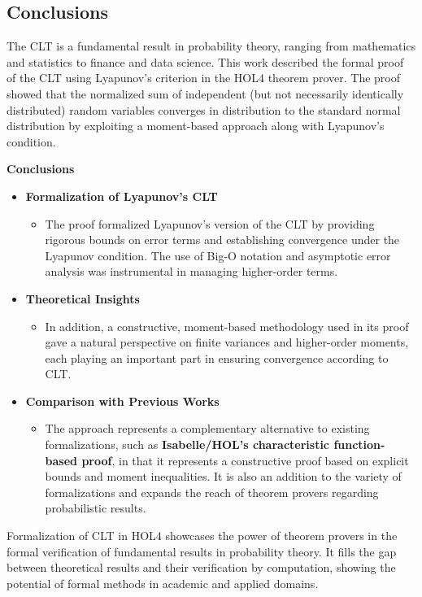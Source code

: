 \subsection{Conclusions}
The CLT is a fundamental result in probability theory, ranging from mathematics and statistics to finance and data science. This work described the formal proof of the CLT using Lyapunov's criterion in the HOL4 theorem prover. The proof showed that the normalized sum of independent (but not necessarily identically distributed) random variables converges in distribution to the standard normal distribution by exploiting a moment-based approach along with Lyapunov's condition.

\textbf{Conclusions}
\begin{itemize}
    \item \textbf{Formalization of Lyapunov's CLT}
    \begin{itemize}
        \item The proof formalized Lyapunov's version of the CLT by providing rigorous bounds on error terms and establishing convergence under the Lyapunov condition. The use of Big-O notation and asymptotic error analysis was instrumental in managing higher-order terms.
    \end{itemize}

    \item \textbf{Theoretical Insights}
    \begin{itemize}
        \item In addition, a constructive, moment-based methodology used in its proof gave a natural perspective on finite variances and higher-order moments, each playing an important part in ensuring convergence according to CLT.
    \end{itemize}

    \item \textbf{Comparison with Previous Works}
    \begin{itemize}
        \item The approach represents a complementary alternative to existing formalizations, such as \textbf{Isabelle/HOL's characteristic function-based proof}, in that it represents a constructive proof based on explicit bounds and moment inequalities. It is also an addition to the variety of formalizations and expands the reach of theorem provers regarding probabilistic results.
    \end{itemize}

\end{itemize}
Formalization of CLT in HOL4 showcases the power of theorem provers in the formal verification of fundamental results in probability theory. It fills the gap between theoretical results and their verification by computation, showing the potential of formal methods in academic and applied domains.


